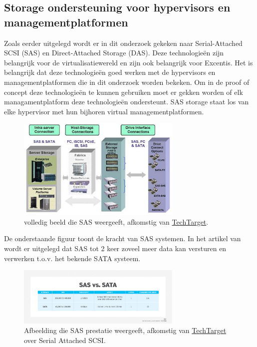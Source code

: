 \subsection{Storage ondersteuning voor hypervisors en managementplatformen}
Zoals eerder uitgelegd wordt er in dit onderzoek gekeken naar Serial-Attached SCSI (SAS) en Direct-Attached Storage (DAS). Deze technologieën zijn belangrijk voor de virtualisatiewereld en zijn ook belangrijk voor Excentis. Het is belangrijk dat deze technologieën goed werken met de hypervisors en managementplatformen die in dit onderzoek worden bekeken.
Om in de proof of concept deze technologieën te kunnen gebruiken moet er gekken worden of elk managamentplatform deze technologieën ondersteunt.
SAS storage staat los van elke hypervisor met hun bijhoren virtual managementplatformen. 
\begin{figure}[h!]
    \centering
    \includegraphics[width=0.7\textwidth]{../onderzoek/storagesas-das.jpg} 
    \caption{volledig beeld die SAS weergeeft, afkomstig van \href{https://www.eetimes.com/serial-attached-scsi-storage-moves-ahead-in-network-server-designs/}{TechTarget}.}
    \label{fig:sas}
\end{figure}
De onderstaande figuur toont de kracht van SAS systemen. In het artikel van \textcite{loshin2022sas} wordt er uitgelegd dat SAS tot 2 keer zoveel meer data kan versturen en verwerken t.o.v. het bekende SATA systeem.
\begin{figure}[h!]
    \centering
    \includegraphics[width=0.7\textwidth]{../onderzoek/sas_vs_sata-f.png} 
    \caption{Afbeelding die SAS prestatie weergeeft, afkomstig van \href{https://www.techtarget.com/searchstorage/definition/serial-attached-SCSI}{TechTarget} over Serial Attached SCSI.}
    \label{fig:sas}
\end{figure}


